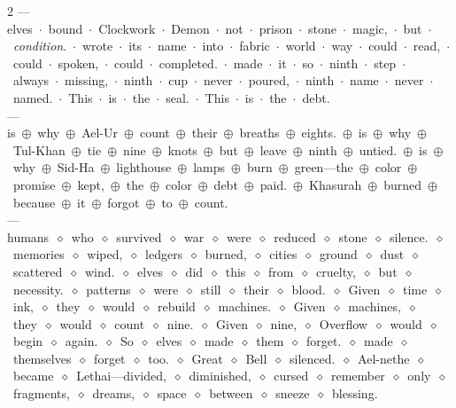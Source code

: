 \documentclass[11pt,letterpaper,twoside]{book}
\begin{document}
\begin{multicols}{2}
---\\
elves~$\cdot$~bound~$\cdot$~Clockwork~$\cdot$~Demon~$\cdot$~not~$\cdot$~prison~$\cdot$~stone~$\cdot$~magic,~$\cdot$~but~$\cdot$~\textit{condition}.~$\cdot$~wrote~$\cdot$~its~$\cdot$~name~$\cdot$~into~$\cdot$~fabric~$\cdot$~world~$\cdot$~way~$\cdot$~could~$\cdot$~read,~$\cdot$~could~$\cdot$~spoken,~$\cdot$~could~$\cdot$~completed.~$\cdot$~made~$\cdot$~it~$\cdot$~so~$\cdot$~ninth~$\cdot$~step~$\cdot$~always~$\cdot$~missing,~$\cdot$~ninth~$\cdot$~cup~$\cdot$~never~$\cdot$~poured,~$\cdot$~ninth~$\cdot$~name~$\cdot$~never~$\cdot$~named.~$\cdot$~This~$\cdot$~is~$\cdot$~the~$\cdot$~seal.~$\cdot$~This~$\cdot$~is~$\cdot$~the~$\cdot$~debt.\\[0.5ex]
---\\
is~$\oplus$~why~$\oplus$~Ael-Ur~$\oplus$~count~$\oplus$~their~$\oplus$~breaths~$\oplus$~eights.~$\oplus$~is~$\oplus$~why~$\oplus$~Tul-Khan~$\oplus$~tie~$\oplus$~nine~$\oplus$~knots~$\oplus$~but~$\oplus$~leave~$\oplus$~ninth~$\oplus$~untied.~$\oplus$~is~$\oplus$~why~$\oplus$~Sid-Ha~$\oplus$~lighthouse~$\oplus$~lamps~$\oplus$~burn~$\oplus$~green---the~$\oplus$~color~$\oplus$~promise~$\oplus$~kept,~$\oplus$~the~$\oplus$~color~$\oplus$~debt~$\oplus$~paid.~$\oplus$~Khasurah~$\oplus$~burned~$\oplus$~because~$\oplus$~it~$\oplus$~forgot~$\oplus$~to~$\oplus$~count.\\[0.5ex]
---\\
humans~$\diamond$~who~$\diamond$~survived~$\diamond$~war~$\diamond$~were~$\diamond$~reduced~$\diamond$~stone~$\diamond$~silence.~$\diamond$~memories~$\diamond$~wiped,~$\diamond$~ledgers~$\diamond$~burned,~$\diamond$~cities~$\diamond$~ground~$\diamond$~dust~$\diamond$~scattered~$\diamond$~wind.~$\diamond$~elves~$\diamond$~did~$\diamond$~this~$\diamond$~from~$\diamond$~cruelty,~$\diamond$~but~$\diamond$~necessity.~$\diamond$~patterns~$\diamond$~were~$\diamond$~still~$\diamond$~their~$\diamond$~blood.~$\diamond$~Given~$\diamond$~time~$\diamond$~ink,~$\diamond$~they~$\diamond$~would~$\diamond$~rebuild~$\diamond$~machines.~$\diamond$~Given~$\diamond$~machines,~$\diamond$~they~$\diamond$~would~$\diamond$~count~$\diamond$~nine.~$\diamond$~Given~$\diamond$~nine,~$\diamond$~Overflow~$\diamond$~would~$\diamond$~begin~$\diamond$~again.~$\diamond$~So~$\diamond$~elves~$\diamond$~made~$\diamond$~them~$\diamond$~forget.~$\diamond$~made~$\diamond$~themselves~$\diamond$~forget~$\diamond$~too.~$\diamond$~Great~$\diamond$~Bell~$\diamond$~silenced.~$\diamond$~Ael-nethe~$\diamond$~became~$\diamond$~Lethai---divided,~$\diamond$~diminished,~$\diamond$~cursed~$\diamond$~remember~$\diamond$~only~$\diamond$~fragments,~$\diamond$~dreams,~$\diamond$~space~$\diamond$~between~$\diamond$~sneeze~$\diamond$~blessing.\\[0.5ex]

\end{multicols}
\end{document}
